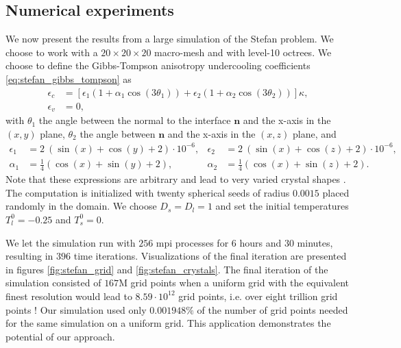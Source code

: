 \subsection{Numerical experiments}
We now present the results from a large simulation of the Stefan problem. We choose to work with a $20\times20\times20$ macro-mesh and with level-10 octrees. We choose to define the Gibbs-Tompson anisotropy undercooling coefficients \eqref{eq:stefan_gibbs_tompson} as
\begin{align*}
\epsilon_c & = \left[ \epsilon_1 \left( 1+\alpha_1 \cos(3\theta_1) \right) + \epsilon_2 \left( 1+\alpha_2 \cos(3\theta_2) \right) \right] \kappa,\\
\epsilon_v & = 0,
\end{align*}
with $\theta_1$ the angle between the normal to the interface $\mathbf{n}$ and the x-axis in the $(x,y)$ plane, $\theta_2$ the angle between $\mathbf{n}$ and the x-axis in the $(x,z)$ plane, and
\begin{align*}
\epsilon_1 & = 2~(\sin(x)+\cos(y)+2)\cdot10^{-6}, & \epsilon_2 & = 2~(\sin(x)+\cos(z)+2)\cdot10^{-6}, \\
\alpha_1 & = \frac{1}{4}(\cos(x)+\sin(y)+2), & \alpha_2 & = \frac{1}{4}(\cos(x)+\sin(z)+2).
\end{align*}
Note that these expressions are arbitrary and lead to very varied crystal shapes . The computation is initialized with twenty spherical seeds of radius $0.0015$ placed randomly in the domain. We choose $D_s=D_l=1$ and set the initial temperatures $T^0_l=-0.25$ and $T^0_s=0$.

We let the simulation run with  $256$ mpi processes for $6$ hours and $30$ minutes, resulting in $396$ time iterations. Visualizations of the final iteration are presented in figures \ref{fig:stefan_grid} and \ref{fig:stefan_crystals}. The final iteration of the simulation consisted of $167$M grid points when a uniform grid with the equivalent finest resolution would lead to $8.59\cdot10^{12}$ grid points, i.e. over eight trillion grid points ! Our simulation used only $0.001948\%$  of the number of grid points needed for the same simulation on a uniform grid. This application demonstrates the potential of our approach.

